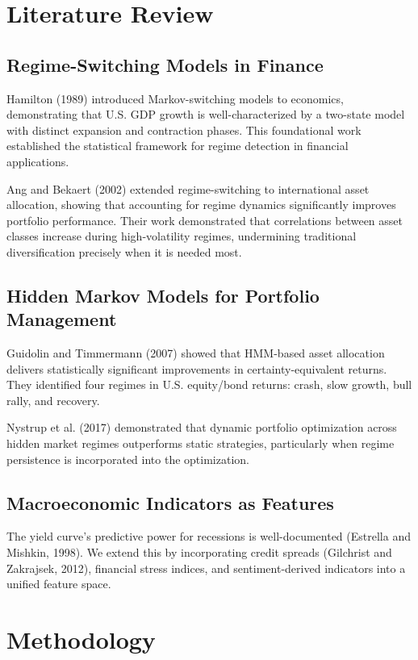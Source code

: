 \documentclass[12pt, a4paper]{article}
\begin{document}
\section{Literature Review}

\subsection{Regime-Switching Models in Finance}

Hamilton (1989) introduced Markov-switching models to economics, demonstrating
that U.S. GDP growth is well-characterized by a two-state model with distinct
expansion and contraction phases. This foundational work established the
statistical framework for regime detection in financial applications.

Ang and Bekaert (2002) extended regime-switching to international asset
allocation, showing that accounting for regime dynamics significantly improves
portfolio performance. Their work demonstrated that correlations between asset
classes increase during high-volatility regimes, undermining traditional
diversification precisely when it is needed most.

\subsection{Hidden Markov Models for Portfolio Management}

Guidolin and Timmermann (2007) showed that HMM-based asset allocation delivers
statistically significant improvements in certainty-equivalent returns. They
identified four regimes in U.S. equity/bond returns: crash, slow growth, bull
rally, and recovery.

Nystrup et al. (2017) demonstrated that dynamic portfolio optimization across
hidden market regimes outperforms static strategies, particularly when regime
persistence is incorporated into the optimization.

\subsection{Macroeconomic Indicators as Features}

The yield curve's predictive power for recessions is well-documented
(Estrella and Mishkin, 1998). We extend this by incorporating credit spreads
(Gilchrist and Zakrajsek, 2012), financial stress indices, and
sentiment-derived indicators into a unified feature space.

\section{Methodology}
\end{document}
